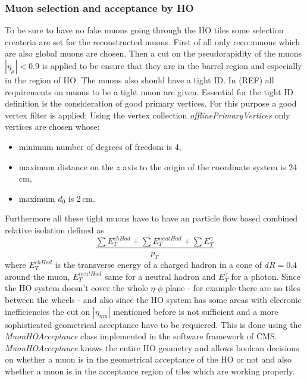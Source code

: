 		\subsubsection{Muon selection and acceptance by HO}
		\label{thesectionhere}
			To be sure to have no fake muons going through the HO tiles some selection createria are set for the reconstructed muons.
			First of all only reco::muons which are also global muons are chosen.
			Then a cut on the pseudorapidity of the muons $|\eta_\mu| < 0.9$ is applied to be ensure that they are in the barrel region and especially in the region of HO.
			The muons also should have a tight ID.
			In (REF) all requirements on muons to be a tight muon are given.
			Essential for the tight ID definition is the consideration of good primary vertices.
			For this purpose a good vertex filter is applied:
			Using the vertex collection \textit{offlinePrimaryVertices} only vertices are chosen whose:
			\begin{itemize}
				\item minimum number of degrees of freedom is 4,
				\item maximum distance on the $z$ axis to the origin of the coordinate system is 24\,cm,
				\item maximum $d_0$ is 2\,cm.
			\end{itemize}
			Furthermore all these tight muons have to have an particle flow based combined relative isolation defined as
			\begin{equation}
				\frac{\sum{E_T^{chHad}} + \sum{E_T^{neutHad}} + \sum{E_T^\gamma}}{p_T}
			\end{equation}
			where $E_T^{chHad}$ is the transverse energy of a charged hadron in a cone of $dR = 0.4$ around the muon, $E_T^{neutHad}$ same for a neutral hadron and $E_T^\gamma$ for a photon.
			Since the HO system doesn't cover the whole $\eta$-$\phi$ plane - for example there are no tiles between the wheels - and also since the HO system has some areas with elecronic inefficiencies the
			cut on $|\eta_{mu}|$ mentioned before is not sufficient and a more sophisticated geometrical acceptance have to be requiered. 
			This is done using the \textit{MuonHOAcceptance} class implemented in the software framework of CMS.
			\textit{MuonHOAcceptance} knows the entire HO geometry and allows boolean decisions on whether a muon is in the geometrical acceptance of the HO or not and also whether a muon is in the acceptance region of
			tiles which are working properly.
